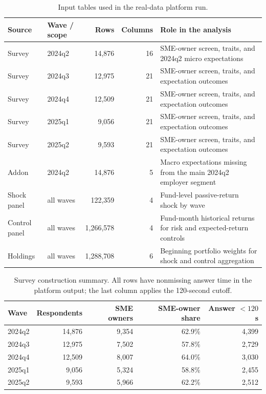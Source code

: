 \documentclass[11pt,letterpaper,english,final]{article}
\begin{document}
\begin{table}[H]
\centering
\small
\caption{Input tables used in the real-data platform run.}
\label{tab:rf_source_read_20260901}
\begin{tabularx}{\textwidth}{llrrX}
\toprule
Source & Wave / scope & Rows & Columns & Role in the analysis \\
\midrule
Survey & 2024q2 & 14{,}876 & 16 & SME-owner screen, traits, and 2024q2 micro expectations \\
Survey & 2024q3 & 12{,}975 & 21 & SME-owner screen, traits, and expectation outcomes \\
Survey & 2024q4 & 12{,}509 & 21 & SME-owner screen, traits, and expectation outcomes \\
Survey & 2025q1 & 9{,}056  & 21 & SME-owner screen, traits, and expectation outcomes \\
Survey & 2025q2 & 9{,}593  & 21 & SME-owner screen, traits, and expectation outcomes \\
Addon  & 2024q2 & 14{,}876 & 5  & Macro expectations missing from the main 2024q2 employer segment \\
Shock panel & all waves & 122{,}359 & 4 & Fund-level passive-return shock by wave \\
Control panel & all waves & 1{,}266{,}578 & 4 & Fund-month historical returns for risk and expected-return controls \\
Holdings & all waves & 1{,}288{,}708 & 6 & Beginning portfolio weights for shock and control aggregation \\
\bottomrule
\end{tabularx}
\end{table}

\begin{table}[H]
\centering
\small
\caption{Survey construction summary. All rows have nonmissing answer time in the platform output; the last column applies the 120-second cutoff.}
\label{tab:rf_survey_construction_20260901}
\begin{tabular}{lrrrr}
\toprule
Wave & Respondents & SME owners & SME-owner share & Answer $<120$s \\
\midrule
2024q2 & 14{,}876 & 9{,}354 & 62.9\% & 4{,}399 \\
2024q3 & 12{,}975 & 7{,}502 & 57.8\% & 2{,}729 \\
2024q4 & 12{,}509 & 8{,}007 & 64.0\% & 3{,}030 \\
2025q1 & 9{,}056  & 5{,}324 & 58.8\% & 2{,}455 \\
2025q2 & 9{,}593  & 5{,}966 & 62.2\% & 2{,}512 \\
\bottomrule
\end{tabular}
\end{table}
\end{document}
